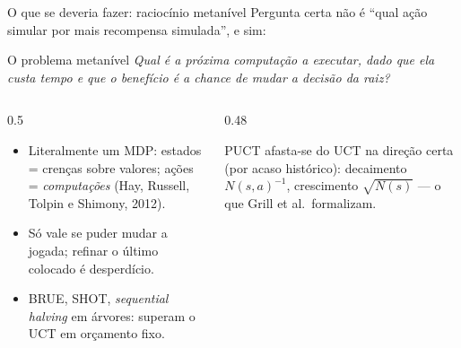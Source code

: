 \documentclass[aspectratio=169, 10pt]{beamer}
\newcommand{\Nvis}{N}
\begin{document}
\begin{frame}{O que se deveria fazer: raciocínio metanível}
  \footnotesize
  Pergunta certa não é ``qual ação simular por mais recompensa simulada'', e sim:

  \begin{center}
    \begin{minipage}{0.84\textwidth}
      \begin{teobox}{O problema metanível}
        \emph{Qual é a próxima computação a executar, dado que ela custa tempo e
        que o benefício é a chance de mudar a decisão da raiz?}
      \end{teobox}
    \end{minipage}
  \end{center}

  \begin{columns}[T]
    \begin{column}{0.5\textwidth}
      \begin{itemize}
        \item Literalmente um MDP: estados = crenças sobre valores; ações = \emph{computações} (Hay, Russell, Tolpin e Shimony, 2012).
        \item Só vale se puder \alert{mudar} a jogada; refinar o último colocado é desperdício.
        \item BRUE, SHOT, \emph{sequential halving} em árvores: superam o UCT em orçamento fixo.
      \end{itemize}
    \end{column}
    \begin{column}{0.48\textwidth}
      \begin{ideiabox}
        PUCT afasta-se do UCT na direção certa (por acaso histórico): decaimento $\Nvis(s,a)^{-1}$, crescimento $\sqrt{\Nvis(s)}$ — o que Grill et al.\ formalizam.
      \end{ideiabox}
    \end{column}
  \end{columns}
\end{frame}
\end{document}

